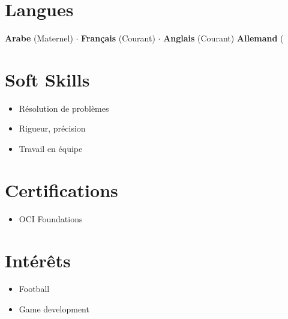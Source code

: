 \documentclass[a4paper,11pt]{article}
\begin{document}
\section{Langues}
\textbf{Arabe} (Maternel) $\cdot$ \textbf{Français} (Courant) $\cdot$ \textbf{Anglais} (Courant)
\textbf{Allemand} (

\begin{minipage}[t]{0.31\textwidth}
  \section{Soft Skills}
  \begin{itemize}[leftmargin=*, nosep, topsep=2pt]
    \item Résolution de problèmes
    \item Rigueur, précision
    \item Travail en équipe
  \end{itemize}
\end{minipage}
\hfill
\begin{minipage}[t]{0.35\textwidth}
  \section{Certifications}
  \begin{itemize}[leftmargin=*, nosep, topsep=2pt]
    \item OCI Foundations
  \end{itemize}
\end{minipage}
\hfill
\begin{minipage}[t]{0.28\textwidth}
  \section{Intérêts}
  \begin{itemize}[leftmargin=*, nosep, topsep=2pt]
    \item Football
    \item Game development
  \end{itemize}
\end{minipage}
\end{document}
